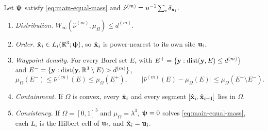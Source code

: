 \begin{proposition}
  \label{prop:sd-mass}
  Let ${\bm{\mathrm{\uppsi}}}$ satisfy \eqref{eq:main-equal-mass} and $\hat\nu^{(m)}=n^{-1}\sum_i\delta_{\hat {\bm{\mathrm{x}}}_i}$.
  \begin{enumerate}[label=(\roman*)]
    \item \emph{Distribution.} $W_\infty(\hat\nu^{(m)},\mu_\Omega)\leq d^{(m)}$.
    \item \emph{Order.} $\hat {\bm{\mathrm{x}}}_i\in L_i(\mathbb R^3;{\bm{\mathrm{\uppsi}}})$, so $\hat {\bm{\mathrm{x}}}_i$ is power-nearest to its own site ${\bm{\mathrm{u}}}_i$.
    \item \emph{Waypoint density.} For every Borel set $E$, with $E^{+}=\{{\bm{\mathrm{y}}}:\operatorname{dist}({\bm{\mathrm{y}}},E)\leq d^{(m)}\}$ and $E^{-}=\{{\bm{\mathrm{y}}}:\operatorname{dist}({\bm{\mathrm{y}}},\mathbb R^3\setminus E)>d^{(m)}\}$,
          \[
            \mu_\Omega(E^{-})\leq\hat\nu^{(m)}(E)\leq\mu_\Omega(E^{+}),\qquad
            \bigl|\hat\nu^{(m)}(E)-\mu_\Omega(E)\bigr|\leq\mu_\Omega(E^{+}\setminus E^{-}).
          \]
    \item \emph{Containment.} If $\Omega$ is convex, every $\hat {\bm{\mathrm{x}}}_i$ and every segment $[\hat {\bm{\mathrm{x}}}_i,\hat {\bm{\mathrm{x}}}_{i+1}]$ lies in $\Omega$.
    \item \emph{Consistency.} If $\Omega=[0,1]^3$ and $\mu_\Omega=\lambda^3$, ${\bm{\mathrm{\uppsi}}}=0$ solves \eqref{eq:main-equal-mass}, each $L_i$ is the Hilbert cell of ${\bm{\mathrm{u}}}_i$, and $\hat {\bm{\mathrm{x}}}_i={\bm{\mathrm{u}}}_i$.
  \end{enumerate}
\end{proposition}

